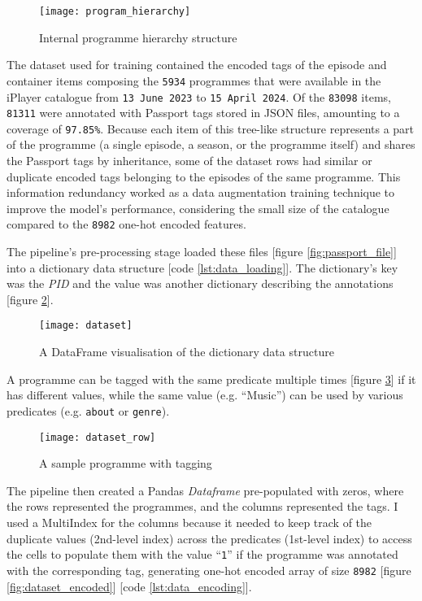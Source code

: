 \begin{figure}[h]
  \centering
  \texttt{[image: program\_hierarchy]}
  \caption{Internal programme hierarchy structure}
  \label{fig:program_hierarchy}
\end{figure}

The dataset used for training contained the encoded tags of the episode and container items composing the \verb|5934| programmes
that were available in the iPlayer catalogue from \verb|13 June 2023| to \verb|15 April 2024|.
Of the \verb|83098| items, \verb|81311| were annotated with Passport tags stored in JSON files, amounting to a coverage of \verb|97.85%|.
Because each item of this tree-like structure represents a part of the programme (a single episode, a season, or the programme itself)
and shares the Passport tags by inheritance,
some of the dataset rows had similar or duplicate encoded tags belonging to the episodes of the same programme.
This information redundancy worked as a data augmentation training technique to improve the model's performance,
considering the small size of the catalogue compared to the \verb|8982| one-hot encoded features.

The pipeline's pre-processing stage loaded these files [figure \ref{fig:passport_file}] into a dictionary data structure [code \ref{lst:data_loading}].
The dictionary's key was the \textit{PID} and the value was another dictionary describing the annotations [figure \ref{fig:dataset}].
\begin{figure}[h]
  \centering
  \texttt{[image: dataset]}
  \caption{A DataFrame visualisation of the dictionary data structure}
  \label{fig:dataset}
\end{figure}
A programme can be tagged with the same predicate multiple times [figure \ref{fig:dataset_row}] if it has different values,
while the same value (e.g. ``Music'') can be used by various predicates (e.g. \verb|about| or \verb|genre|).
\begin{figure}[h]
  \centering
  \texttt{[image: dataset\_row]}
  \caption{A sample programme with tagging}
  \label{fig:dataset_row}
\end{figure}
The pipeline then created a Pandas \textit{Dataframe} pre-populated with zeros,
where the rows represented the programmes, and the columns represented the tags.
I used a MultiIndex \cite{Pandas:MultiIndex} for the columns because it needed to keep track of the duplicate values (2nd-level index)
across the predicates (1st-level index) to access the cells to populate them with the value ``\verb|1|''
if the programme was annotated with the corresponding tag, generating one-hot encoded array of size \verb|8982| [figure \ref{fig:dataset_encoded}] [code \ref{lst:data_encoding}].

